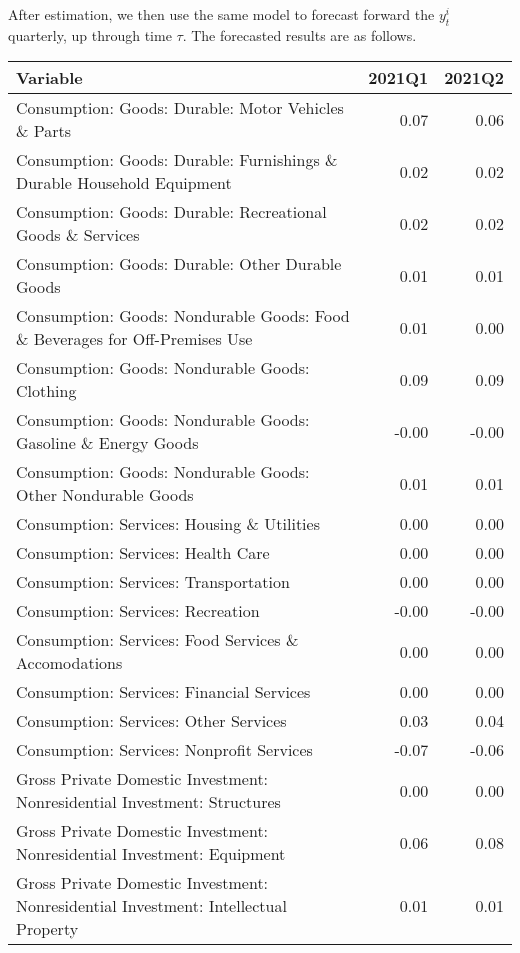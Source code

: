 \documentclass[11pt, letterpaper]{article}\usepackage[]{graphicx}\usepackage[]{color}
\begin{document}
After estimation, we then use the same model to forecast forward the $y^i_t$ quarterly, up through time $\tau$. 
The forecasted results are as follows.
\begin{table}[H]
\centering
\begingroup\scriptsize
\begin{tabular}{lrr}
  \hline
Variable & 2021Q1 & 2021Q2 \\ 
  \hline
Consumption: Goods: Durable: Motor Vehicles \& Parts & 0.07 & 0.06 \\ 
  Consumption: Goods: Durable: Furnishings \& Durable Household Equipment & 0.02 & 0.02 \\ 
  Consumption: Goods: Durable: Recreational Goods \& Services & 0.02 & 0.02 \\ 
  Consumption: Goods: Durable: Other Durable Goods & 0.01 & 0.01 \\ 
  Consumption: Goods: Nondurable Goods: Food \& Beverages for Off-Premises Use & 0.01 & 0.00 \\ 
  Consumption: Goods: Nondurable Goods: Clothing & 0.09 & 0.09 \\ 
  Consumption: Goods: Nondurable Goods: Gasoline \& Energy Goods & -0.00 & -0.00 \\ 
  Consumption: Goods: Nondurable Goods: Other Nondurable Goods & 0.01 & 0.01 \\ 
  Consumption: Services: Housing \& Utilities & 0.00 & 0.00 \\ 
  Consumption: Services: Health Care & 0.00 & 0.00 \\ 
  Consumption: Services: Transportation & 0.00 & 0.00 \\ 
  Consumption: Services: Recreation & -0.00 & -0.00 \\ 
  Consumption: Services: Food Services \& Accomodations & 0.00 & 0.00 \\ 
  Consumption: Services: Financial Services & 0.00 & 0.00 \\ 
  Consumption: Services: Other Services & 0.03 & 0.04 \\ 
  Consumption: Services: Nonprofit Services & -0.07 & -0.06 \\ 
  Gross Private Domestic Investment: Nonresidential Investment: Structures & 0.00 & 0.00 \\ 
  Gross Private Domestic Investment: Nonresidential Investment: Equipment & 0.06 & 0.08 \\ 
  Gross Private Domestic Investment: Nonresidential Investment: Intellectual Property & 0.01 & 0.01 \\ 

\end{tabular}
\end{table}
\end{document}
